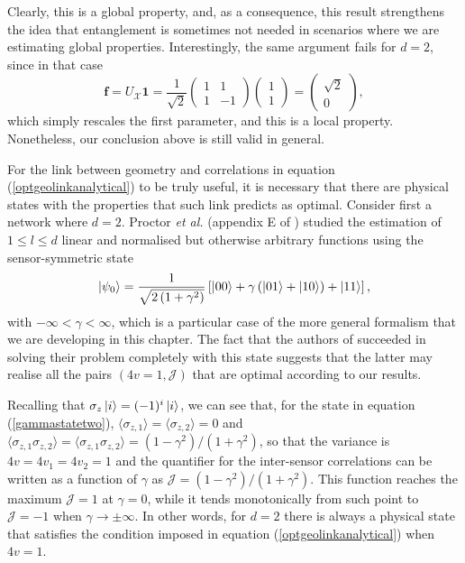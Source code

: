 Clearly, this is a global property, and, as a consequence, this result strengthens the idea that entanglement is sometimes not needed in scenarios where we are estimating global properties. Interestingly, the same argument fails for $d=2$, since in that case
\begin{equation}
\boldsymbol{f} = U_{\mathcal{X}}\boldsymbol{1} = \frac{1}{\sqrt{2}}
\begin{pmatrix}
1 & 1 \\
1 & -1
\end{pmatrix}
\begin{pmatrix}
1 \\
1
\end{pmatrix} =
\begin{pmatrix}
\sqrt{2} \\
0
\end{pmatrix},
\end{equation}
which simply rescales the first parameter, and this is a local property. Nonetheless, our conclusion above is still valid in general.

For the link between geometry and correlations in equation (\ref{optgeolinkanalytical}) to be truly useful, it is necessary that there are physical states with the properties that such link predicts as optimal. Consider first a network where $d=2$. Proctor \emph{et al.} (appendix E of \cite{proctor2017networked}) studied the estimation of $1 \leqslant l \leqslant d$ linear and normalised but otherwise arbitrary functions using the sensor-symmetric state 
\begin{equation}
\ket{\psi_0} = \frac{1}{\sqrt{2\left(1+\gamma^2\right)}}\left[\ket{0 0} + \gamma\left(\ket{01} + \ket{10}  \right) + \ket{1 1}\right],
\label{gammastatetwo}
\end{equation}
with $-\infty < \gamma < \infty$, which is a particular case of the more general formalism that we are developing in this chapter. The fact that the authors of \cite{proctor2017networked} succeeded in solving their problem completely with this state suggests that the latter may realise all the pairs $(4v = 1, \mathcal{J})$ that are optimal according to our results.

Recalling that $\sigma_z \ket{i} = (-1)^{i}\ket{i}$, we can see that, for the state in equation (\ref{gammastatetwo}), $\langle \sigma_{z,1} \rangle = \langle \sigma_{z,2} \rangle = 0$ and $\langle \sigma_{z,1} \sigma_{z,2} \rangle = \langle \sigma_{z,1} \sigma_{z,2} \rangle = (1-\gamma^2)/(1+\gamma^2)$, so that the variance is $4v = 4v_1 = 4v_2 = 1$ and the quantifier for the inter-sensor correlations can be written as a function of $\gamma$ as $\mathcal{J}=(1-\gamma^2)/(1+\gamma^2)$. This function reaches the maximum $\mathcal{J}=1$ at $\gamma = 0$, while it tends monotonically from such point to $\mathcal{J} = - 1$ when $\gamma \rightarrow \pm \infty$. In other words, for $d=2$ there is always a physical state that satisfies the condition imposed in equation (\ref{optgeolinkanalytical}) when $4v = 1$.

